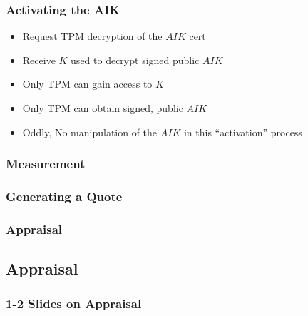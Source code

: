 \documentclass{beamer}
\def \aikh {\hash{AIK}}
\def \att {Att}
\def \tp {TPM}
\begin{document}
\begin{frame}[fragile]
  \frametitle{Activating the AIK}

  \begin{center}
  \end{center}

    \begin{itemize}
    \item Request TPM decryption of the $AIK$ cert
    \item Receive $K$ used to decrypt signed public $AIK$
    \item Only TPM can gain access to $K$
    \item Only TPM can obtain signed, public $AIK$
    \item Oddly, No manipulation of the $AIK$ in this ``activation''
      process
    \end{itemize}

\end{frame}

\begin{frame}
  \frametitle{Measurement}
\end{frame}

\begin{frame}
  \frametitle{Generating a Quote}
\end{frame}

\begin{frame}
  \frametitle{Appraisal}
\end{frame}

\subsection{Appraisal}

\begin{frame}
  \frametitle{1-2 Slides on Appraisal}
\end{frame}
\end{document}
